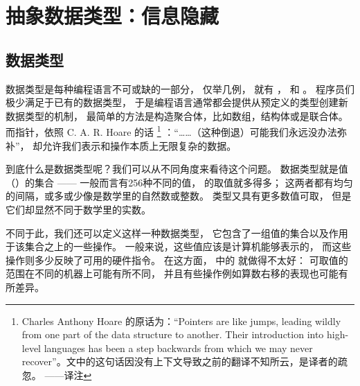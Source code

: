 

\chapter{抽象数据类型：信息隐藏}
\label{ch:AbstractDateTypes}

\section{数据类型}
\label{sec:datatype}

数据类型是每种编程语言不可或缺的一部分，
仅举几例， 就有 ， 和 。
程序员们极少满足于已有的数据类型，
于是编程语言通常都会提供从预定义的类型创建新数据类型的机制，
最简单的方法是构造聚合体，比如数组，结构体或是联合体。
而指针，依照 C. A. R. Hoare 的话
\footnote{
Charles Anthony Hoare 的原话为：``Pointers are like jumps, leading wildly
from one part of the data structure to another. Their introduction into
high-level languages has been a step backwards from which we may never
recover''。文中的这句话因没有上下文导致之前的翻译不知所云，是译者的疏忽。
\hfill ——译注
}%
：“……（这种倒退）可能我们永远没办法弥补”，
却允许我们表示和操作本质上无限复杂的数据。

到底什么是数据类型呢？我们可以从不同角度来看待这个问题。
数据类型就是值（）的集合
—— 一般而言有256种不同的值，
 的取值就多得多；
这两者都有均匀的间隔，或多或少像是数学里的自然数或整数。
 类型又具有更多数值可取，
但是它们却显然不同于数学里的实数。

不同于此，我们还可以定义这样一种数据类型，
它包含了一组值的集合以及作用于该集合之上的一些操作。
一般来说，这些值应该是计算机能够表示的，
而这些操作则多少反映了可用的硬件指令。
在这方面， 中的  就做得不太好：
可取值的范围在不同的机器上可能有所不同，
并且有些操作例如算数右移的表现也可能有所差异。

